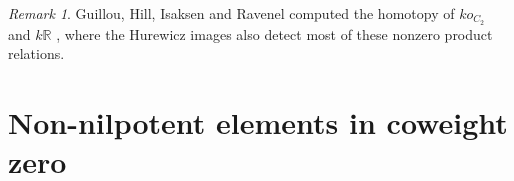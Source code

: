 \documentclass[psamsfonts]{amsart}
\newcommand{\Z}{\mathbb Z}
\theoremstyle{definition}
\theoremstyle{remark}
\newtheorem{remark}[theorem]{Remark}
\newcommand{\R}{\mathbb{R}}
\numberwithin{equation}{section}
\begin{document}





\begin{remark}
Guillou, Hill, Isaksen and Ravenel computed the homotopy of $ko_{C_2}$ and $k\R$ \cite{GHIR}, where the Hurewicz images also detect most of these nonzero product relations.
\end{remark}

\section{Non-nilpotent elements in coweight zero} \label{sec:cw0}
\end{document}
